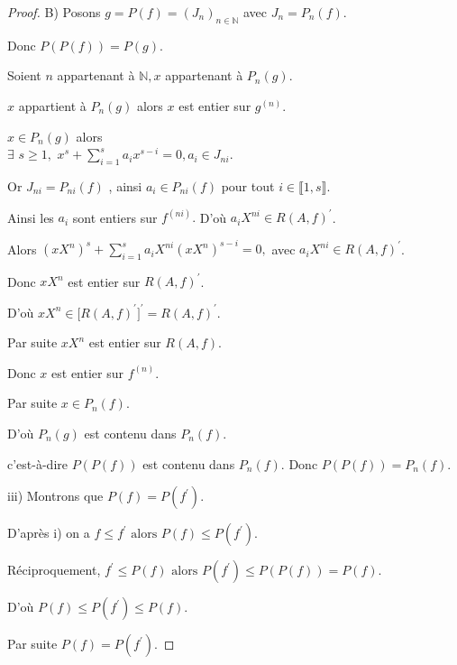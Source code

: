 \begin{proof}
	B) Posons $g=P(f)=(J_{n})_{n\in \mathbb{N}}$ avec $J_{n}=P_{n}(f)$.
	
	Donc $P(P(f))=P(g)$.
	
	Soient $n$ appartenant à $ \mathbb{N},x$ appartenant à $ P_{n}(g).$
	
	$x$ appartient à $ P_{n}(g)$ alors $x$ est entier sur $g^{(n)}$.
	
	$x\in P_{n}(g)$ alors \\ $\exists$  $s\geq 1,$ $x^{s}+\sum\limits_{i=1}^{s}a_{i}x^{s-i}=0,a_{i}\in J_{ni}$.
	
	Or $J_{ni}=P_{ni}(f)$ , ainsi $a_{i}\in P_{ni}(f)$ pour tout $i\in \llbracket 1, s \rrbracket.$
	
	Ainsi les $a_{i}$ sont entiers sur $f^{(ni)}.$ D'où $a_{i}X^{ni}\in R(A,f)^{\prime }$.
	
	Alors $(xX^{n})^{s}+\sum\limits_{i=1}^{s}a_{i}X^{ni}(xX^{n})^{s-i}=0,$ avec 
	$a_{i}X^{ni}\in R(A,f)^{\prime }$.
	
	Donc $xX^{n}$ est entier sur $R(A,f)^{\prime }$.
	
	D'où $xX^{n}\in \lbrack R(A,f)^{\prime }]^{\prime }=R(A,f)^{\prime }$.
	
	Par suite $xX^{n}$ est entier sur $R(A,f)$.
	
	Donc $x$ est entier sur $f^{(n)}$.
	
	Par suite $x\in P_{n}(f).$
	
	D'où $P_{n}(g)$ est contenu dans $ P_{n}(f).$
	
	c'est-\`{a}-dire $P(P(f))$ est contenu dans $ P_{n}(f).$ Donc $P(P(f))=P_{n}(f).$
	
	iii) Montrons que $P(f)=P(f^{\prime })$.
	
	D'après i) on a $f\leq f^{\prime }\text{ alors } P(f)\leq P(f^{\prime })$.
	
	Réciproquement, $f^{\prime }\leq P(f)\text{ alors } P(f^{\prime })\leq
	P(P(f))=P(f)$.
	
	D'où $P(f)\leq P(f^{\prime })\leq P(f)$.
	
	Par suite $P(f)=P(f^{\prime })$.
\end{proof}

